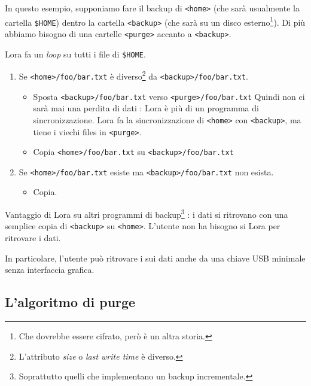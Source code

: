 \documentclass[a4paper,12pt]{article}
\newcommand{\info}[1]{\texttt{#1}}
\begin{document}
In questo esempio, supponiamo fare il backup di \info{<home>} (che sarà usualmente la cartella \info{\$HOME}) dentro la cartella \info{<backup>} (che sarà su un disco esterno\footnote{Che dovrebbe essere cifrato, però è un altra storia.}). Di più abbiamo bisogno di una cartelle \info{<purge>} accanto a \info{<backup>}.

Lora fa un \emph{loop} su tutti i file di \info{\$HOME}.

\begin{enumerate}
    \item
        Se \info{<home>/foo/bar.txt} è diverso\footnote{L'attributo \emph{size} o \emph{last write time} è diverso.}  da \info{<backup>/foo/bar.txt}. 
        \begin{itemize}
            \item Sposta \info{<backup>/foo/bar.txt} verso \info{<purge>/foo/bar.txt} Quindi non ci sarà mai una perdita di dati : Lora è più di un programma di sincronizzazione. Lora fa la sincronizzazione di \info{<home>} con \info{<backup>}, ma tiene i viechi files in \info{<purge>}.
            \item Copia \info{<home>/foo/bar.txt} su \info{<backup>/foo/bar.txt}
        \end{itemize}
    \item
        Se \info{<home>/foo/bar.txt} esiste ma \info{<backup>/foo/bar.txt} non esista.
        \begin{itemize}
            \item Copia.
        \end{itemize}
\end{enumerate}

Vantaggio di Lora su altri programmi di backup\footnote{Soprattutto quelli che implementano un backup incrementale.} : i dati si ritrovano con una semplice copia di \info{<backup>} su \info{<home>}. L'utente non ha bisogno si Lora per ritrovare i dati. 

In particolare, l'utente può ritrovare i sui dati anche da una chiave USB minimale senza interfaccia grafica. 

\subsection{L'algoritmo di purge}
\end{document}
